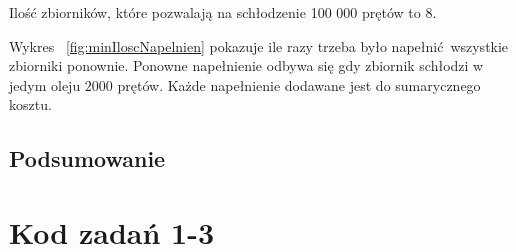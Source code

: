 \documentclass[varwidth,12pt,a4paper]{article}
\begin{document}
Ilość zbiorników, które pozwalają na schłodzenie 100 000 prętów to $8$. 

Wykres ~\ref{fig:minIloscNapelnien} pokazuje ile razy trzeba było napełnić wszystkie zbiorniki ponownie.
Ponowne napełnienie odbywa się gdy zbiornik schłodzi w jedym oleju $2000$ prętów.
Każde napełnienie dodawane jest do sumarycznego kosztu.

\afterpage{\clearpage}

\subsection{Podsumowanie}

\section{Kod zadań 1-3}

\end{document}

